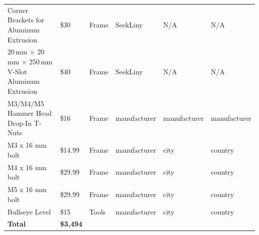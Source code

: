 \begin{longtable}{|p{4cm}|p{2cm}|p{2cm}|p{2.5cm}|p{2.5cm}|p{2.5cm}|}
Corner Brackets for Aluminum Extrusion & \$30 & Frame & SeekLiny & N/A & N/A \\
20\,mm $\times$ 20\,mm $\times$ 250\,mm V-Slot Aluminum Extrusion & \$40 & Frame & SeekLiny & N/A & N/A \\
M3/M4/M5 Hammer Head Drop-In T-Nuts & \$16 & Frame & manufacturer & manufacturer & manufacturer \\
M3 x 16 mm bolt & \$14.99 & Frame & manufacturer & city & country \\
M4 x 16 mm bolt & \$29.99 & Frame & manufacturer & city & country \\
M5 x 16 mm bolt & \$29.99 & Frame & manufacturer & city & country \\
Bullseye Level & \$15 & Tools & manufacturer & city & country \\
\hline
\textbf{Total} &
\textbf{\$3,494} &
&
&
&
\\
\end{longtable}